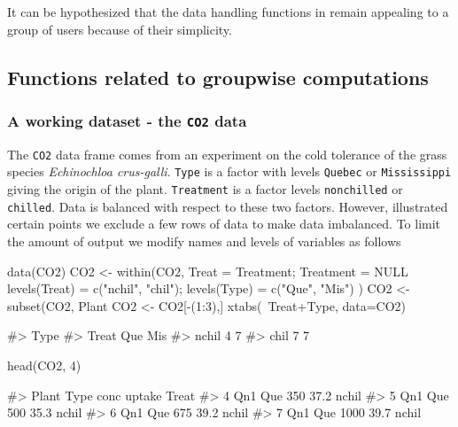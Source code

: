 It can be hypothesized that the data handling functions in 
remain appealing to a group of users because of their simplicity.

\hypertarget{functions-related-to-groupwise-computations}{%
\subsection{Functions related to groupwise
computations}\label{functions-related-to-groupwise-computations}}

\hypertarget{a-working-dataset---the-co2-data}{%
\subsubsection{\texorpdfstring{A working dataset - the \texttt{CO2}
data}{A working dataset - the CO2 data}}\label{a-working-dataset---the-co2-data}}

The \texttt{CO2} data frame comes from an experiment on the cold
tolerance of the grass species \emph{Echinochloa crus-galli}.
\texttt{Type} is a factor with levels \texttt{Quebec} or
\texttt{Mississippi} giving the origin of the plant. \texttt{Treatment}
is a factor levels \texttt{nonchilled} or \texttt{chilled}. Data is
balanced with respect to these two factors. However, illustrated certain
points we exclude a few rows of data to make data imbalanced. To limit
the amount of output we modify names and levels of variables as follows

\begin{Schunk}
\begin{Sinput}
data(CO2)
CO2 <- within(CO2, {
    Treat = Treatment; Treatment = NULL
    levels(Treat) = c("nchil", "chil"); levels(Type) = c("Que", "Mis")
})
CO2 <- subset(CO2, Plant %
CO2 <- CO2[-(1:3),]
xtabs(~Treat+Type, data=CO2)
\end{Sinput}
\begin{Soutput}
#>        Type
#> Treat   Que Mis
#>   nchil   4   7
#>   chil    7   7
\end{Soutput}
\begin{Sinput}
head(CO2, 4)
\end{Sinput}
\begin{Soutput}
#>   Plant Type conc uptake Treat
#> 4   Qn1  Que  350   37.2 nchil
#> 5   Qn1  Que  500   35.3 nchil
#> 6   Qn1  Que  675   39.2 nchil
#> 7   Qn1  Que 1000   39.7 nchil
\end{Soutput}
\end{Schunk}

